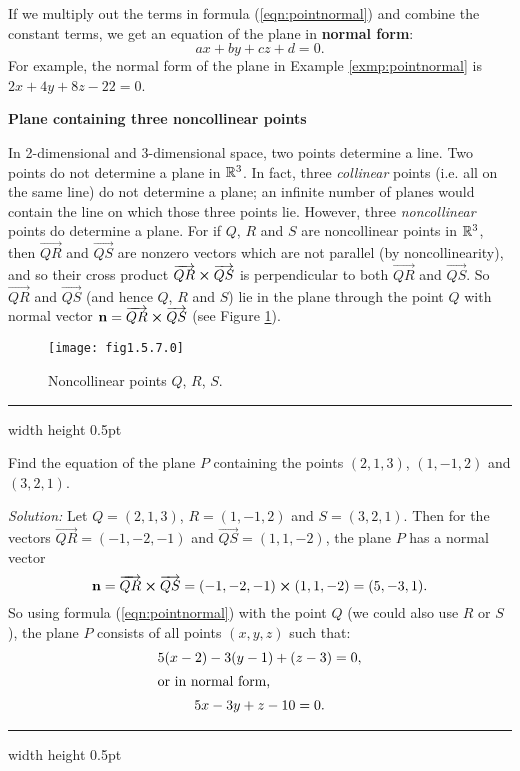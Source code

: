 If we multiply out the terms in formula (\ref{eqn:pointnormal}) and combine the constant terms, we get an
equation of the plane in \textbf{normal form}:
\begin{equation}
 ax + by + cz + d = 0.
\end{equation}
For example, the normal form of the plane in Example \ref{exmp:pointnormal} is $2x + 4y + 8z - 22 = 0$.
\pagebreak[3]
\par\noindent\textbf{\large{Plane containing three noncollinear points}}\normalsize\smallskip

In 2-dimensional and 3-dimensional space, two points determine a line. Two points do not determine a plane in
$\mathbb{R}^{3}$. 
In fact, three \emph{collinear} points (i.e. all on the same line)
do not determine a plane; an infinite number of planes would contain the line on which those three points lie.
However, three \emph{noncollinear} points do determine a plane. For if $Q$, $R$ and $S$ are noncollinear points in
$\mathbb{R}^{3}$, then $\overrightarrow{QR}$ and $\overrightarrow{QS}$ are  nonzero vectors which are not parallel (by
noncollinearity), and so their cross product $\overrightarrow{QR} \bm{\times} \overrightarrow{QS}$ is perpendicular to
both $\overrightarrow{QR}$ and $\overrightarrow{QS}$. So $\overrightarrow{QR}$ and
$\overrightarrow{QS}$ (and hence $Q$, $R$ and $S$) lie in the plane through the point $Q$ with normal vector
$\mathbf{n} = \overrightarrow{QR} \bm{\times} \overrightarrow{QS}$ (see Figure \ref{fig:plane3pts}).

\begin{figure}[h]
 \begin{center}
  \texttt{[image: fig1.5.7.0]}
 \end{center}
 \caption[]{\quad Noncollinear points $Q$, $R$, $S$.}
 \label{fig:plane3pts}
\end{figure}

\hrule width \textwidth height 0.5pt
\begin{exmp}\label{exmp:plane3pts}
 Find the equation of the plane $P$ containing the points $(2,1,3)$, $(1,-1,2)$ and $(3,2,1)$.\smallskip
 \par\noindent\emph{Solution:} Let $Q = (2,1,3)$, $R = (1,-1,2)$ and $S = (3,2,1)$. Then for the vectors
 $\overrightarrow{QR} = (-1,-2,-1)$ and $\overrightarrow{QS} = (1,1,-2)$, the plane $P$ has a normal vector
 \begin{displaymath}
  \mathbf{n} = \overrightarrow{QR} \bm{\times} \overrightarrow{QS} = (-1,-2,-1) \bm{\times} (1,1,-2) = (5,-3,1).
 \end{displaymath}
 So using formula (\ref{eqn:pointnormal}) with the point $Q$ (we could also use $R$ or $S$), the plane $P$ consists of
 all points $(x,y,z)$ such that:
 \begin{gather*}
  5(x - 2) - 3(y - 1) + (z - 3) = 0,\\
  \intertext{or in normal form,}
  5x - 3y + z - 10 = 0.
 \end{gather*}
\end{exmp}
\hrule width \textwidth height 0.5pt
\smallskip

